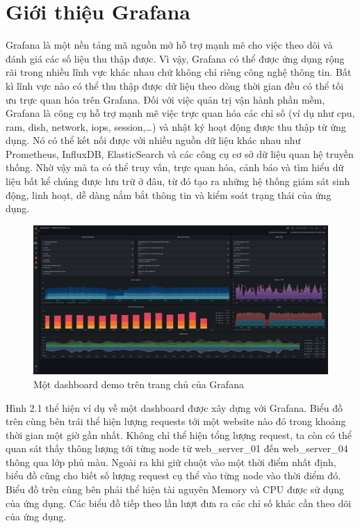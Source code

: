 \section{Giới thiệu Grafana}
Grafana là một nền tảng mã nguồn mở hỗ trợ mạnh mẽ cho việc theo dõi và đánh giá các số liệu thu thập được. Vì vậy, Grafana có thể được ứng dụng rộng rãi trong nhiều lĩnh vực khác nhau chứ không chỉ riêng công nghệ thông tin. Bất kì lĩnh vực nào có thể thu thập được dữ liệu theo dòng thời gian đều có thể tối ưu trực quan hóa trên Grafana.
Đối với việc quản trị vận hành phần mềm, Grafana là công cụ hỗ trợ mạnh mẽ việc trực quan hóa các chỉ số (ví dụ như cpu, ram, dish, network, iops, session,…) và nhật ký hoạt động được thu thập từ ứng dụng. Nó có thể kết nối được với nhiều nguồn dữ liệu khác nhau như Prometheus, InfluxDB, ElasticSearch và các công cụ cơ sở dữ liệu quan hệ truyền thống. Nhờ vậy mà ta có thể truy vấn, trực quan hóa, cảnh báo và tìm hiểu dữ liệu bất kể chúng được lưu trữ ở đâu, từ đó tạo ra những hệ thống giám sát sinh động, linh hoạt, dễ dàng nắm bắt thông tin và kiểm soát trạng thái của ứng dụng. 

\begin{figure}[H] %
    \centering %
    \includegraphics[width=1\textwidth]{figures/fig_01.png} 
    \caption{Một dashboard demo trên trang chủ của Grafana} %
    \label{fig:fig_01}
\end{figure}

Hình 2.1 thể hiện ví dụ về một dashboard được xây dựng với Grafana. Biểu đồ trên cùng bên trái thể hiện lượng requests tới một website nào đó trong khoảng thời gian một giờ gần nhất. Không chỉ thể hiện tổng lượng request, ta còn có thể quan sát thấy thông lượng tới từng node từ web\_server\_01 đến web\_server\_04 thông qua lớp phủ màu. Ngoài ra khi giữ chuột vào một thời điểm nhất định, biểu đồ cũng cho biết số lượng request cụ thể vào từng node vào thời điểm đó. Biểu đồ trên cùng bên phải thể hiện tài nguyên Memory và CPU được sử dụng của ứng dụng. Các biểu đồ tiếp theo lần lượt đưa ra các chỉ số khác cần theo dõi của ứng dụng.

